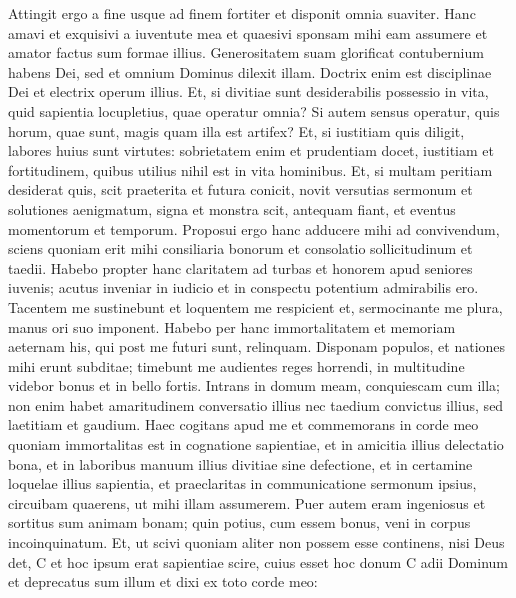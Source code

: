 \begin{biblechapter}
\begin{biblechapter}
\begin{biblechapter}
\begin{biblechapter}
\begin{biblechapter}
\begin{biblechapter}
\begin{biblechapter}
\begin{biblechapter}
\verse Attingit ergo a fine usque ad finem fortiter
 et disponit omnia suaviter.
 \verse Hanc amavi et exquisivi a iuventute mea
 et quaesivi sponsam mihi eam assumere
 et amator factus sum formae illius. 
 \verse Generositatem suam glorificat contubernium habens Dei,
 sed et omnium Dominus dilexit illam.
 \verse Doctrix enim est disciplinae Dei
 et electrix operum illius.
 \verse Et, si divitiae sunt desiderabilis possessio in vita,
 quid sapientia locupletius,
 quae operatur omnia?
 \verse Si autem sensus operatur,
 quis horum, quae sunt, magis quam illa est artifex?
 \verse Et, si iustitiam quis diligit,
 labores huius sunt virtutes:
 sobrietatem enim et prudentiam docet,
 iustitiam et fortitudinem,
 quibus utilius nihil est in vita hominibus.
 \verse Et, si multam peritiam desiderat quis,
 scit praeterita et futura conicit,
 novit versutias sermonum et solutiones aenigmatum,
 signa et monstra scit, antequam fiant,
 et eventus momentorum et temporum.
 \verse Proposui ergo hanc adducere mihi ad convivendum,
 sciens quoniam erit mihi consiliaria bonorum
 et consolatio sollicitudinum et taedii.
 \verse Habebo propter hanc claritatem ad turbas
 et honorem apud seniores iuvenis;
 \verse acutus inveniar in iudicio
 et in conspectu potentium admirabilis ero.
 \verse Tacentem me sustinebunt
 et loquentem me respicient
 et, sermocinante me plura,
 manus ori suo imponent.
 \verse Habebo per hanc immortalitatem
 et memoriam aeternam his, qui post me futuri sunt, relinquam.
 \verse Disponam populos,
 et nationes mihi erunt subditae;
 \verse timebunt me audientes reges horrendi,
 in multitudine videbor bonus
 et in bello fortis.
 \verse Intrans in domum meam, conquiescam cum illa;
 non enim habet amaritudinem conversatio illius
 nec taedium convictus illius,
 sed laetitiam et gaudium.
 \verse Haec cogitans apud me
 et commemorans in corde meo
 quoniam immortalitas est in cognatione sapientiae,
 \verse et in amicitia illius delectatio bona,
 et in laboribus manuum illius divitiae sine defectione,
 et in certamine loquelae illius sapientia,
 et praeclaritas in communicatione sermonum ipsius,
 circuibam quaerens, ut mihi illam assumerem.
 \verse Puer autem eram ingeniosus
 et sortitus sum animam bonam;
 \verse quin potius, cum essem bonus,
 veni in corpus incoinquinatum.
 \verse Et, ut scivi quoniam aliter non possem esse continens, nisi Deus det,
 C et hoc ipsum erat sapientiae scire, cuius esset hoc donum C
 adii Dominum et deprecatus sum illum
 et dixi ex toto corde meo:
 

\end{biblechapter}
\end{biblechapter}
\end{biblechapter}
\end{biblechapter}
\end{biblechapter}
\end{biblechapter}
\end{biblechapter}
\end{biblechapter}
